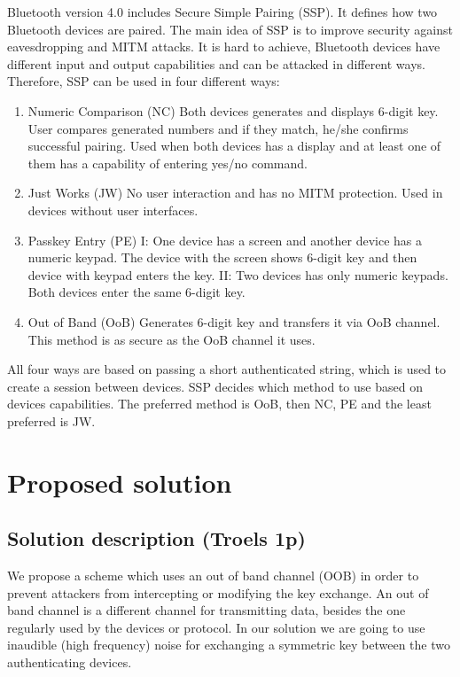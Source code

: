 \documentclass[12pt]{article}
\begin{document}
Bluetooth version 4.0 includes Secure Simple Pairing (SSP). It defines how two Bluetooth devices are paired. The main idea of SSP is to improve security against eavesdropping and MITM attacks. It is hard to achieve, Bluetooth devices have different input and output capabilities and can be attacked in different ways. Therefore, SSP can be used in four different ways:
\begin{enumerate}
	\item Numeric Comparison (NC)
	Both devices generates and displays 6-digit key. User compares generated numbers and if they match, he/she confirms successful pairing. Used when both devices has a display and at least one of them has a capability of entering yes/no command.
	\item Just Works (JW)
	No user interaction and has no MITM protection. Used in devices without user interfaces.

	\item Passkey Entry (PE)
I: One device has a screen and another device has a numeric keypad. The device with the screen shows 6-digit key and then device with keypad enters the key.
	II: Two devices has only numeric keypads. Both devices enter the same 6-digit key.

	\item Out of Band (OoB)
Generates 6-digit key and transfers it via OoB channel. This method is as secure as the OoB channel it uses.
\end{enumerate}
All four ways are based on passing a short authenticated string, which is used to create a session between devices. SSP decides which method to use based on devices capabilities. The preferred method is  OoB, then NC, PE and the least preferred is JW.

\newpage

\section{Proposed solution}
\label{sec:Proposed solution}

\subsection{Solution description (Troels 1p)}
\label{sub:Solution description}

We propose a scheme which uses an out of band channel (OOB) in order to prevent attackers from intercepting or modifying the key exchange. An out of band channel is a different channel for transmitting data, besides the one regularly used by the devices or protocol. In our solution we are going to use inaudible (high frequency) noise for exchanging a symmetric key between the two authenticating devices.
\end{document}
